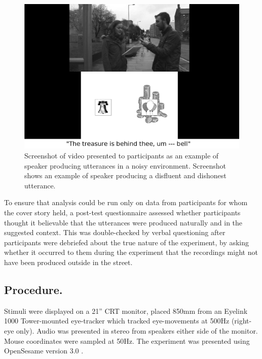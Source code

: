 \documentclass[a4paper,man,natbib]{apa6}
\begin{document}
\begin{figure}[Ht]
  \centering
	\includegraphics[scale=.2]{convincer.png}
  \caption{Screenshot of video presented to participants as an example of speaker producing utterances in a noisy environment. Screenshot shows an example of speaker producing a disfluent and dishonest utterance.}
  \label{fig:vid}
\end{figure}


To ensure that analysis could be run only on data from participants for whom the cover story held, a post-test questionnaire assessed whether participants thought it believable that the utterances were produced naturally and in the suggested context. 
This was double-checked by verbal questioning after participants were debriefed about the true nature of the experiment, by asking whether it occurred to them during the experiment that the recordings might not have been produced outside in the street.


\subsection{Procedure.}
Stimuli were displayed on a 21'' CRT monitor, placed 850mm from an Eyelink 1000 Tower-mounted eye-tracker which tracked eye-movements at 500Hz (right-eye only). 
Audio was presented in stereo from speakers either side of the monitor. 
Mouse coordinates were sampled at 50Hz. 
The experiment was presented using OpenSesame version 3.0 \citep{Mathot2012}.
\end{document}
